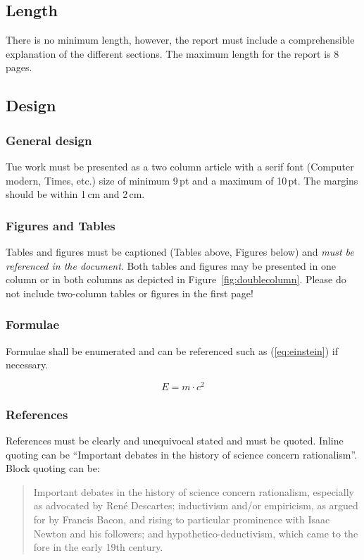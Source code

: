 	\subsection{Length}
	
	There is no minimum length, however, the report must include a comprehensible explanation of the different sections. The maximum length for the report is 8 pages.


	
	\subsection{Design}
	
	\subsubsection{General design}
	
	Tue work must be presented as a two column article with a serif font (Computer modern, Times, etc.)  size of minimum 9\,pt and a maximum of 10\,pt. The margins should be within 1\,cm and 2\,cm.
	
	\subsubsection{Figures and Tables}
	Tables and figures must be captioned (Tables above, Figures below) and \emph{must be referenced in the document}. Both tables and figures may be presented in one column or in both columns as depicted in Figure~\ref{fig:doublecolumn}. Please do not include two-column tables or figures in the first page!
	

	
	\subsubsection{Formulae}
	Formulae shall be enumerated and can be referenced such as (\ref{eq:einstein}) if necessary.
	
	\begin{equation}
		E=m\cdot c^2 \label{eq:einstein}
	\end{equation}
	
	\subsubsection{References}
	References must be clearly and unequivocal stated and must be quoted. Inline quoting can be ``Important debates in the history of science concern rationalism''\cite{scientificMethod}. Block quoting can be:
	\begin{quotation}
		Important debates in the history of science concern rationalism, especially as advocated by René Descartes; inductivism and/or empiricism, as argued for by Francis Bacon, and rising to particular prominence with Isaac Newton and his followers; and hypothetico-deductivism, which came to the fore in the early 19th century.\cite{scientificMethod}
	\end{quotation}
	
